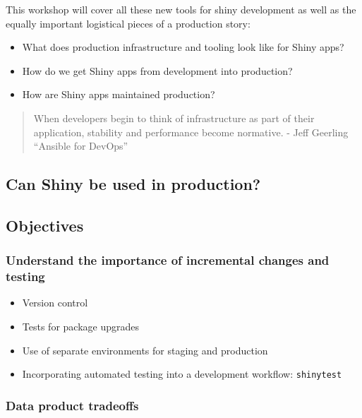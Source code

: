 \documentclass[]{book}
\providecommand{\tightlist}{%
  \setlength{\itemsep}{0pt}\setlength{\parskip}{0pt}}
\theoremstyle{definition}
\theoremstyle{definition}
\theoremstyle{definition}
\theoremstyle{remark}
\begin{document}
This workshop will cover all these new tools for shiny development as
well as the equally important logistical pieces of a production story:

\begin{itemize}
\tightlist
\item
  What does production infrastructure and tooling look like for Shiny
  apps?
\item
  How do we get Shiny apps from development into production?
\item
  How are Shiny apps maintained production?
\end{itemize}

\begin{quote}
When developers begin to think of infrastructure as part of their
application, stability and performance become normative. - Jeff Geerling
``Ansible for DevOps''
\end{quote}

\hypertarget{can-shiny-be-used-in-production}{%
\subsection{Can Shiny be used in
production?}\label{can-shiny-be-used-in-production}}

\hypertarget{objectives}{%
\subsection{Objectives}\label{objectives}}

\hypertarget{understand-the-importance-of-incremental-changes-and-testing}{%
\subsubsection{Understand the importance of incremental changes and
testing}\label{understand-the-importance-of-incremental-changes-and-testing}}

\begin{itemize}
\tightlist
\item
  Version control
\item
  Tests for package upgrades
\item
  Use of separate environments for staging and production
\item
  Incorporating automated testing into a development workflow:
  \texttt{shinytest}
\end{itemize}

\hypertarget{data-product-tradeoffs}{%
\subsubsection{Data product tradeoffs}\label{data-product-tradeoffs}}
\end{document}
